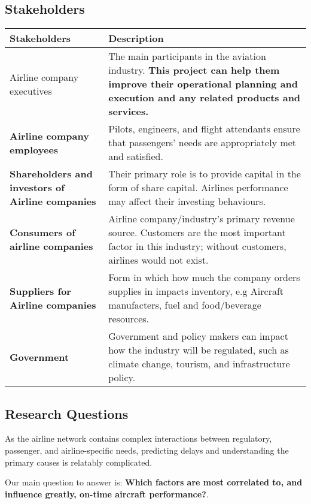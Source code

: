 \documentclass[
]{article}
\begin{document}
\hypertarget{stakeholders}{%
\subsection{Stakeholders}\label{stakeholders}}

\begin{table}
\centering
\begin{tabular}[t]{>{}l||>{\raggedright\arraybackslash}p{30em}}
\hline
Stakeholders & Description\\
\hline
Airline company executives & The main participants in the aviation industry. 
\textbf{This project can help them improve their operational planning and execution and any related products and services.}\\
\hline
\textbf{Airline company employees} & Pilots, engineers, and flight attendants ensure that passengers' needs are appropriately met and satisfied.\\
\hline
\textbf{Shareholders and investors of Airline companies} & Their primary role is to provide capital in the form of share capital. Airlines performance may affect their investing behaviours.\\
\hline
\textbf{Consumers of airline companies} & Airline company/industry’s primary revenue source. Customers are the most important factor in this industry; without customers, airlines would not exist.\\
\hline
\textbf{Suppliers for Airline companies} & Form in which how much the company orders supplies in impacts inventory, e.g Aircraft manufacters, fuel and food/beverage resources.\\
\hline
\textbf{Government} & Government and policy makers can impact how the industry will be regulated, such as climate change, tourism, and infrastructure policy.\\
\hline
\end{tabular}
\end{table}

\hypertarget{research-questions}{%
\subsection{Research Questions}\label{research-questions}}

As the airline network contains complex interactions between regulatory,
passenger, and airline-specific needs, predicting delays and
understanding the primary causes is relatably complicated.

Our main question to answer is: \textbf{Which factors are most
correlated to, and influence greatly, on-time aircraft performance?}.
\end{document}
